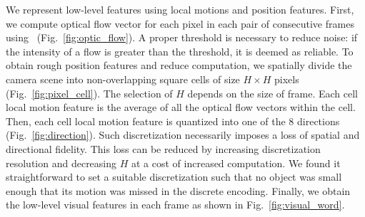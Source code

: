 We represent low-level features using local motions and position features. 
First, we compute optical flow vector for each pixel in each pair of consecutive frames using~\cite{C.Liu_opticflow} (Fig.~\ref{fig:optic_flow}). A proper threshold is necessary to reduce noise: if the  intensity of a flow is greater than the threshold, it is deemed as reliable. 
To obtain rough position features and reduce computation, we spatially divide the camera scene into non-overlapping square cells of size $H\times H$ pixels (Fig.~\ref{fig:pixel_cell}). The selection of $H$ depends on the size of frame.
Each cell local motion feature is the average of all the optical flow vectors within the cell. Then,  each cell local motion feature is quantized into one of the 8 directions (Fig.~\ref{fig:direction}). 
Such discretization necessarily imposes a loss of spatial and directional fidelity. This loss can be reduced by increasing discretization resolution and decreasing $H$ at a cost of increased computation. 
We found it straightforward to set a suitable discretization such that no object was small enough that its motion was missed in the discrete encoding.
Finally, we obtain the low-level visual features in each frame as shown in Fig.~\ref{fig:visual_word}.

